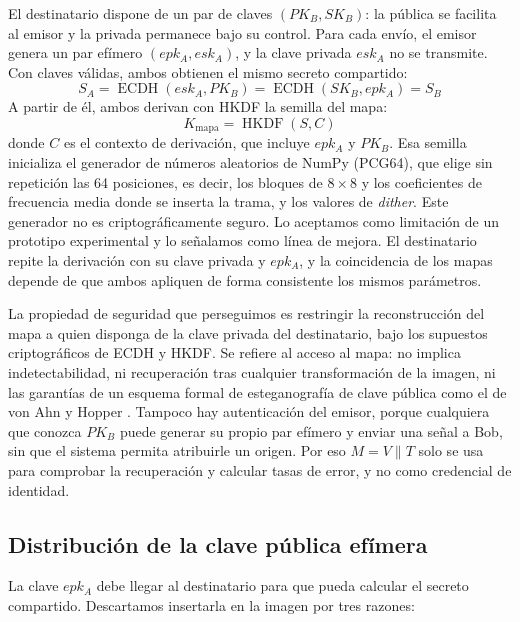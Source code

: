 \documentclass[IB]{TFUOC}%
\begin{document}
El destinatario dispone de un par de claves $(PK_B, SK_B)$: la pública se facilita al emisor y la privada permanece bajo su control. Para cada envío, el emisor genera un par efímero $(epk_A, esk_A)$, y la clave privada $esk_A$ no se transmite. Con claves válidas, ambos obtienen el mismo secreto compartido:
\begin{equation}
S_A = \operatorname{ECDH}(esk_A, PK_B) = \operatorname{ECDH}(SK_B, epk_A) = S_B
\end{equation}
A partir de él, ambos derivan con HKDF la semilla del mapa:
\begin{equation}
K_{\mathrm{mapa}} = \operatorname{HKDF}(S, C)
\end{equation}
donde $C$ es el contexto de derivación, que incluye $epk_A$ y $PK_B$. Esa semilla inicializa el generador de números aleatorios de NumPy (PCG64), que elige sin repetición las 64 posiciones, es decir, los bloques de $8\times8$ y los coeficientes de frecuencia media donde se inserta la trama, y los valores de \textit{dither}. Este generador no es criptográficamente seguro. Lo aceptamos como limitación de un prototipo experimental y lo señalamos como línea de mejora. El destinatario repite la derivación con su clave privada y $epk_A$, y la coincidencia de los mapas depende de que ambos apliquen de forma consistente los mismos parámetros.

La propiedad de seguridad que perseguimos es restringir la reconstrucción del mapa a quien disponga de la clave privada del destinatario, bajo los supuestos criptográficos de ECDH y HKDF. Se refiere al acceso al mapa: no implica indetectabilidad, ni recuperación tras cualquier transformación de la imagen, ni las garantías de un esquema formal de esteganografía de clave pública como el de von Ahn y Hopper \cite{4}. Tampoco hay autenticación del emisor, porque cualquiera que conozca $PK_B$ puede generar su propio par efímero y enviar una señal a Bob, sin que el sistema permita atribuirle un origen. Por eso $M=V\parallel T$ solo se usa para comprobar la recuperación y calcular tasas de error, y no como credencial de identidad.

\subsection{Distribución de la clave pública efímera}
\label{subsec:distribucion_epk}

La clave $epk_A$ debe llegar al destinatario para que pueda calcular el secreto compartido. Descartamos insertarla en la imagen por tres razones:
\end{document}
